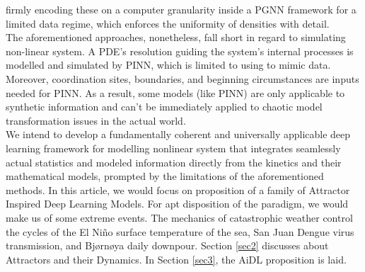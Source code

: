 \documentclass[conference]{IEEEtran}
\begin{document}
firmly encoding these on a computer granularity inside a PGNN framework for a limited data regime, which enforces the uniformity of densities with detail. \\

The aforementioned approaches, nonetheless, fall short in regard to simulating non-linear system. A PDE's resolution guiding the system's internal processes is modelled and simulated by PINN, which is limited to using to mimic data. Moreover, coordination sites, boundaries, and beginning circumstances are inputs needed for PINN. As a result, some models (like PINN) are only applicable to synthetic information and can't be immediately applied to chaotic model transformation issues in the actual world. \\

We intend to develop a fundamentally coherent and universally applicable deep learning framework for modelling nonlinear system that integrates seamlessly actual statistics and modeled information directly from the kinetics and their mathematical models, prompted by the limitations of the aforementioned methods. In this article, we would focus on proposition of a family of Attractor Inspired Deep Learning Models. For apt disposition of the paradigm, we would make us of some extreme events. The mechanics of catastrophic weather control the cycles of the El Niño surface temperature of the sea, San Juan Dengue virus transmission, and Bjørnøya daily downpour. Section \ref{sec2} discusses about Attractors and their Dynamics. In Section \ref{sec3}, the AiDL proposition is laid. 
\end{document}
